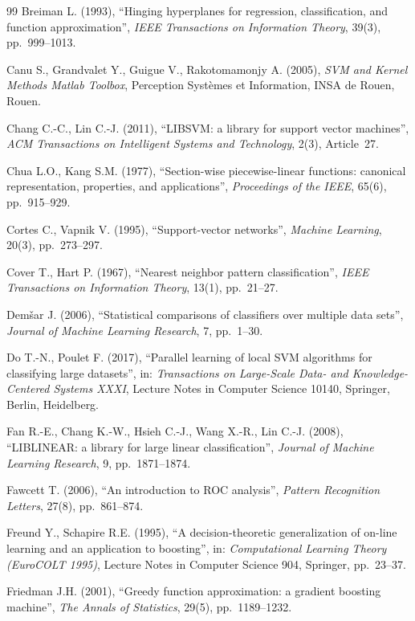\begin{thebibliography}{99}
 Breiman L. (1993), “Hinging hyperplanes for regression, classification, and function approximation”, \emph{IEEE Transactions on Information Theory}, 39(3), pp.~999--1013.

 Canu S., Grandvalet Y., Guigue V., Rakotomamonjy A. (2005), \emph{SVM and Kernel Methods Matlab Toolbox}, Perception Systèmes et Information, INSA de Rouen, Rouen.

 Chang C.-C., Lin C.-J. (2011), “LIBSVM: a library for support vector machines”, \emph{ACM Transactions on Intelligent Systems and Technology}, 2(3), Article~27.

 Chua L.O., Kang S.M. (1977), “Section-wise piecewise-linear functions: canonical representation, properties, and applications”, \emph{Proceedings of the IEEE}, 65(6), pp.~915--929.

 Cortes C., Vapnik V. (1995), “Support-vector networks”, \emph{Machine Learning}, 20(3), pp.~273--297.

 Cover T., Hart P. (1967), “Nearest neighbor pattern classification”, \emph{IEEE Transactions on Information Theory}, 13(1), pp.~21--27.

 Demšar J. (2006), “Statistical comparisons of classifiers over multiple data sets”, \emph{Journal of Machine Learning Research}, 7, pp.~1--30.

 Do T.-N., Poulet F. (2017), “Parallel learning of local SVM algorithms for classifying large datasets”, in: \emph{Transactions on Large-Scale Data- and Knowledge-Centered Systems XXXI}, Lecture Notes in Computer Science 10140, Springer, Berlin, Heidelberg.

 Fan R.-E., Chang K.-W., Hsieh C.-J., Wang X.-R., Lin C.-J. (2008), “LIBLINEAR: a library for large linear classification”, \emph{Journal of Machine Learning Research}, 9, pp.~1871--1874.

 Fawcett T. (2006), “An introduction to ROC analysis”, \emph{Pattern Recognition Letters}, 27(8), pp.~861--874.

 Freund Y., Schapire R.E. (1995), “A decision-theoretic generalization of on-line learning and an application to boosting”, in: \emph{Computational Learning Theory (EuroCOLT 1995)}, Lecture Notes in Computer Science 904, Springer, pp.~23--37.

 Friedman J.H. (2001), “Greedy function approximation: a gradient boosting machine”, \emph{The Annals of Statistics}, 29(5), pp.~1189--1232.


\end{thebibliography}
